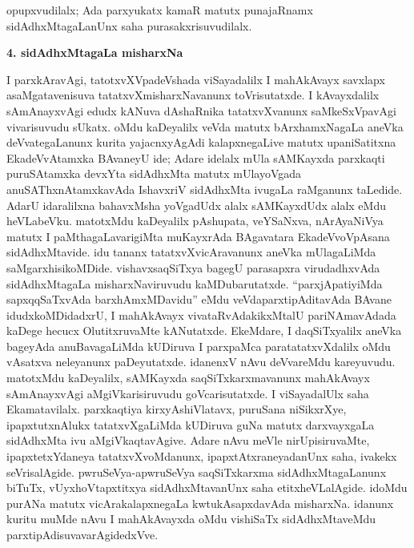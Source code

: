 opupxvudilalx; Ada parxyukatx kamaR matutx punajaRnamx sidAdhxMtagaLanUnx saha purasakxrisuvudilalx.

\smallskip
\begin{center}
{\Large\bf 4. sidAdhxMtagaLa misharxNa}
\end{center}

I parxkAravAgi, tatotxvXVpadeVshada viSayadalilx I mahAkAvayx savxlapx asaMgata\-venisuva tatatxvXmisharxNavanunx toVrisutatxde. I kAvayxdalilx sAmAnayxvAgi edudx kANuva dAshaRnika tatatxvXvanunx saMkeSxVpavAgi vivarisuvudu sUkatx. oMdu kaDeyalilx veVda matutx bArxhamxNagaLa aneVka deVvategaLanunx kurita yajacnxyAgAdi kalapxnegaLive matutx upaniSatitxna EkadeVvAtamxka BAvaneyU ide; Adare idelalx mUla sAMKayxda parxkaqti puruSAtamxka devxYta sidAdhxMta matutx mUlayoVgada anuSAThxnAtamxkavAda IshavxriV sidAdhxMta ivugaLa raMganunx taLedide. AdarU idaralilxna bahavxMsha yoVgadUdx alalx sAMKayxdUdx alalx eMdu heVLabeVku. matotxMdu kaDeyalilx pAshupata, veYSaNxva, nArAyaNiVya matutx I paMthagaLavarigiMta muKayxrAda BAgavatara EkadeVvoVpAsana sidAdhxMtavide. idu tananx tatatxvXvicAravanunx aneVka mUlagaLiMda saMgarxhisikoMDide. vishavxsaqSiTxya bagegU parasapxra virudadhxvAda sidAdhxMtagaLa misharxNaviruvudu kaMDubarutatxde. ``parxjApatiyiMda sapxqqSaTxvAda barxhAmxMDavidu'' eMdu veVdaparxtipAditavAda BAvane idudxkoMDidadxrU, I mahAkAvayx vivataRvAdakikxMtalU pariNAmavAdada kaDege hecucx OlutitxruvaMte kANutatxde. EkeMdare, I daqSiTxyalilx aneVka bageyAda anuBavagaLiMda kUDiruva I parxpaMca paratatatxvXdalilx oMdu vAsatxva neleyanunx paDeyutatxde. idanenxV nAvu deVvareMdu kareyuvudu. matotxMdu kaDeyalilx, sAMKayxda saqSiTxkarxmavanunx mahAkAvayx sAmAnayxvAgi aMgiVkarisiruvudu goVcarisutatxde. I viSayadalUlx saha Ekamatavilalx. parxkaqtiya kirxyAshiVlatavx, puruSana niSikxrXye, ipapxtutxnAlukx tatatxvXgaLiMda kUDiruva guNa matutx darxvayxgaLa sidAdhxMta ivu aMgiVkaqtavAgive. Adare nAvu meVle nirUpisiruvaMte, ipapxtetxYdaneya tatatxvXvoMdanunx, ipapxtAtxraneyadanUnx saha, ivakekx seVrisalAgide. pwruSeVya-apwruSeVya saqSiTxkarxma sidAdhxMtagaLanunx biTuTx, vUyxhoVtapxtitxya sidAdhxMtavanUnx saha etitxheVLalAgide. idoMdu purANa matutx vicArakalapxnegaLa kwtukAsapxdavAda misharxNa. idanunx kuritu muMde nAvu I mahAkAvayxda oMdu vishiSaTx sidAdhxMtaveMdu parxtipAdisuvavarAgidedxVve.

